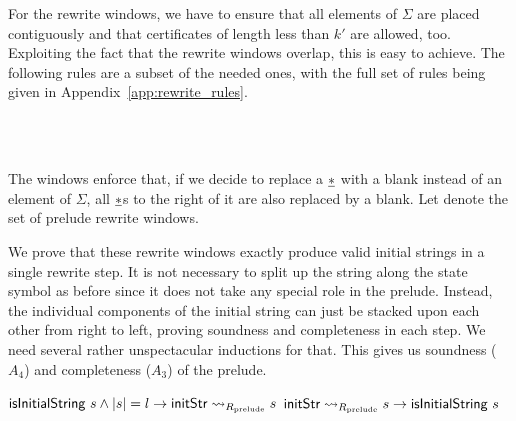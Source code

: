 For the rewrite windows, we have to ensure that all elements of $\Sigma$ are placed contiguously and that certificates of length less than $k'$ are allowed, too. Exploiting the fact that the rewrite windows overlap, this is easy to achieve. The following rules are a subset of the needed ones, with the full set of rules being given in Appendix~\ref{app:rewrite_rules}.
\begin{center}
  \trewwin{\nblank}{\nblank}{\nblank}{\polneut\blank}{\polneut\blank}{\polneut\blank}
  \quad \trewwin{\ndelim}{\nblank}{\nblank}{\#}{\polneut\blank}{\polneut\blank}
  \quad \trewwin{\nblank}{\nblank}{\ndelim}{\polneut\blank}{\polneut\blank}{\#}\\
  \quad {}
  \quad {}
  \quad {}\\
  \quad {} 
  \quad {} 
\end{center}
The windows enforce that, if we decide to replace a $\underline{*}$ with a blank instead of an element of $\Sigma$, all $\underline{*}$s to the right of it are also replaced by a blank.
Let \mnotec[prelueRules]{$\Rprelude$} denote the set of prelude rewrite windows.

We prove that these rewrite windows exactly produce valid initial strings in a single rewrite step.
It is not necessary to split up the string along the state symbol as before since it does not take any special role in the prelude. Instead, the individual components of the initial string can just be stacked upon each other from right to left, proving soundness and completeness in each step. We need several rather unspectacular inductions for that.
This gives us soundness ($A_4$) and completeness ($A_3$) of the prelude.
\begin{lemma}\label{lem:prelude_sound_complete}\leavevmode
  \begin{enumerate}
     $\textsf{isInitialString}~s \land |s| = l \rightarrow \textsf{initStr} \rightsquigarrow_{R_{\text{prelude}}} s$
     $\textsf{initStr} \rightsquigarrow_{R_{\text{prelude}}} s \rightarrow \textsf{isInitialString}~s$
  \end{enumerate}
\end{lemma}

